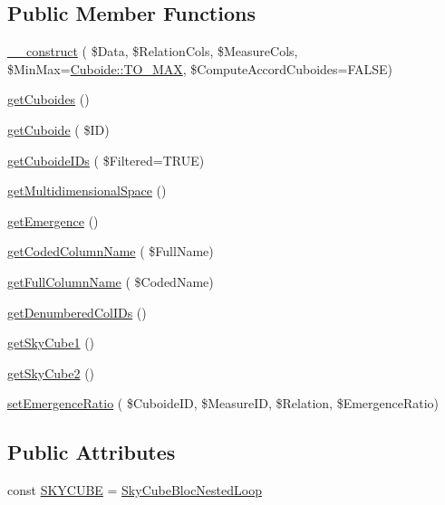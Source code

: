 \subsection*{Public Member Functions}
\begin{DoxyCompactItemize}
\item 
\hyperlink{class_sky_cube_emergent_a89310a748541bbb5bd80d06856c1389d}{\+\_\+\+\_\+construct} ( \$Data, \$Relation\+Cols, \$Measure\+Cols, \$Min\+Max=\hyperlink{class_cuboide_afd49ea48fafb0362d27f78f6f4ef8b84}{Cuboide\+::\+T\+O\+\_\+\+M\+AX}, \$Compute\+Accord\+Cuboides=F\+A\+L\+SE)
\item 
\hyperlink{class_sky_cube_emergent_a0b0ce3c41a95b6ad6e08fead3b039aef}{get\+Cuboides} ()
\item 
\hyperlink{class_sky_cube_emergent_a4d57d1390c0f7d5fcef3b4d390eaf9dd}{get\+Cuboide} ( \$ID)
\item 
\hyperlink{class_sky_cube_emergent_ab24162e08074631a59fa8296297ba83f}{get\+Cuboide\+I\+Ds} ( \$Filtered=T\+R\+UE)
\item 
\hyperlink{class_sky_cube_emergent_a7b3d1065a82ab98551cddf73736ca0dd}{get\+Multidimensional\+Space} ()
\item 
\hyperlink{class_sky_cube_emergent_aaf96f2ab0f3d08a64fa705bd70e26642}{get\+Emergence} ()
\item 
\hyperlink{class_sky_cube_emergent_a59f1edc639c052706138c5dbf5c13bf7}{get\+Coded\+Column\+Name} ( \$Full\+Name)
\item 
\hyperlink{class_sky_cube_emergent_a95634c4bc29bfe9aa749d913d87bc435}{get\+Full\+Column\+Name} ( \$Coded\+Name)
\item 
\hyperlink{class_sky_cube_emergent_a587b7cd54c91f8584640e67b8e92a9be}{get\+Denumbered\+Col\+I\+Ds} ()
\item 
\hyperlink{class_sky_cube_emergent_abadefcec9918f46ec90c89d00a056a69}{get\+Sky\+Cube1} ()
\item 
\hyperlink{class_sky_cube_emergent_a28db7414d829b6678c1c662dc6eba875}{get\+Sky\+Cube2} ()
\item 
\hyperlink{class_sky_cube_emergent_a3f8b195c4c2ea5d82ecf9ff78661bdee}{set\+Emergence\+Ratio} ( \$Cuboide\+ID, \$Measure\+ID, \$Relation, \$Emergence\+Ratio)
\end{DoxyCompactItemize}
\subsection*{Public Attributes}
\begin{DoxyCompactItemize}
\item 
const \hyperlink{class_sky_cube_emergent_a0aa3c66bf0a7556f980e7d7c5afd359a}{S\+K\+Y\+C\+U\+BE} = \textquotesingle{}\hyperlink{class_sky_cube_bloc_nested_loop}{Sky\+Cube\+Bloc\+Nested\+Loop}\textquotesingle{}
\end{DoxyCompactItemize}
